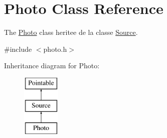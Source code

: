 \hypertarget{classPhoto}{\section{Photo Class Reference}
\label{classPhoto}
}


The \hyperlink{classPhoto}{Photo} class heritee de la classe \hyperlink{classSource}{Source}.  




{\ttfamily \#include $<$photo.\-h$>$}

Inheritance diagram for Photo\-:\begin{figure}[H]
\begin{center}
\leavevmode
\includegraphics[height=3.000000cm]{classPhoto}
\end{center}
\end{figure}
